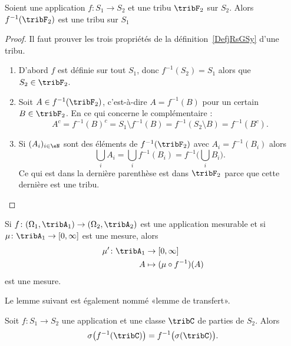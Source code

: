 \begin{lemma}       \label{LemooVDXJooZNYelH}
	Soient une application \( f\colon S_1\to S_2\) et une tribu \( \tribF_2\) sur \( S_2\). Alors \( f^{-1}(\tribF_2)\) est une tribu sur \( S_1\)
\end{lemma}

\begin{proof}
	Il faut prouver les trois propriétés de la définition~\ref{DefjRsGSy} d'une tribu.
	\begin{enumerate}
		\item
		      D'abord \( f\) est définie sur tout \( S_1\), donc \( f^{-1}(S_2)=S_1\) alors que \( S_2\in \tribF_2\).
		\item
		      Soit \( A\in f^{-1}(\tribF_2)\), c'est-à-dire \( A=f^{-1}(B)\) pour un certain \( B\in \tribF_2\). En ce qui concerne le complémentaire :
		      \begin{equation}
			      A^c=f^{-1}(B)^c=S_1\setminus f^{-1}(B)=f^{-1}(S_2\setminus B)=f^{-1}(B^c).
		      \end{equation}
		\item
		      Si \( (A_i)_{i\in \eN}\) sont des éléments de \( f^{-1}(\tribF_2)\) avec \( A_i=f^{-1}(B_i)\) alors
		      \begin{equation}
			      \bigcup_iA_i=\bigcup_if^{-1}(B_i)=f^{-1}\big( \bigcup_iB_i \big).
		      \end{equation}
		      Ce qui est dans la dernière parenthèse est dans \( \tribF_2\) parce que cette dernière est une tribu.
	\end{enumerate}
\end{proof}

\begin{proposition}	\label{PROPooJXMKooNNNXaT}
	Si \(f \colon (\Omega_1,\tribA_1)\to (\Omega_2,\tribA_2)  \) est une application mesurable et si \(\mu \colon \tribA_1\to \mathopen[ 0,\infty\mathclose]  \) est une mesure, alors
	\begin{equation}
		\begin{aligned}
			\mu'\colon \tribA_1 & \to \mathopen[ 0,\infty\mathclose] \\
			A                   & \mapsto (\mu\circ f^{-1})   (A)
		\end{aligned}
	\end{equation}
	est une mesure.
\end{proposition}

Le lemme suivant est également nommé «lemme de transfert».
\begin{lemma}       \label{LemOQTBooWGYuDU}
	Soit \( f\colon S_1\to S_2\) une application et une classe \( \tribC\) de parties de \( S_2\). Alors
	\begin{equation}
		\sigma\big( f^{-1}(\tribC) \big)=f^{-1}\big( \sigma(\tribC) \big).
	\end{equation}
\end{lemma}

